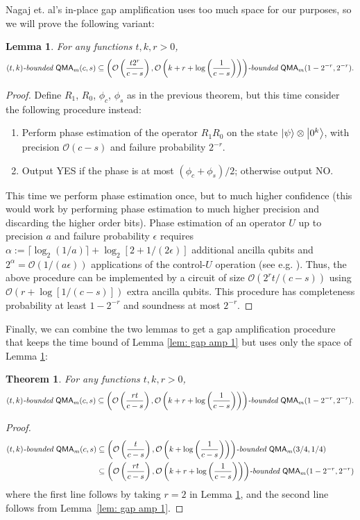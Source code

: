 \documentclass[11pt]{article}
\newtheorem{theorem}{Theorem}
\newtheorem{lemma}{Lemma}
\theoremstyle{definition}
\theoremstyle{remark}
\theoremstyle{definition}
\newcommand\QMA{{\sf{QMA}}}
\newcommand\bddQMA[5]{{\left(#1,#2\right)}\textit{-bounded }\QMA_{#3}(#4,#5)}
\newcommand\bigoh{\mathcal{O}}
\begin{document}
Nagaj et. al's in-place gap amplification uses too much space for our purposes, so we will prove the following variant:
\begin{lemma} \label{lem: gap amp 2}
For any functions $t,k,r>0$, 
\[
\bddQMA{t}{k}{m}{c}{s}\subseteq\bddQMA{\mathcal{O}\left(\frac{t2^r}{c-s}\right)}{\mathcal{O}\left(k+r+\log\left(\frac{1}{c-s}\right)\right)}{m}{1-2^{-r}}{2^{-r}}.
\]
\end{lemma}
\begin{proof}
Define $R_1$, $R_0$, $\phi_c$, $\phi_s$ as in the previous theorem, but this time consider the following procedure instead:
\begin{enumerate}
\item Perform phase estimation of the operator $R_1R_0$ on the state ${\left\vert{\psi}\right\rangle}\otimes {\left\vert{0^k}\right\rangle}$, with precision $\bigoh (c-s)$ and failure probability $2^{-r}$.
\item Output YES if the phase is at most $(\phi_{c}+\phi_{s})/2$; otherwise output NO.
\end{enumerate}
This time we perform phase estimation once, but to much higher confidence (this would work by performing phase estimation to much higher precision and discarding the higher order bits). 
Phase estimation of an operator $U$ up to precision $a$ and failure probability $\epsilon$ requires $\alpha := \lceil\log_2(1/a)\rceil + \log_2[2+1/(2\epsilon)]$ additional ancilla qubits and $2^\alpha = \mathcal{O}(1/(a\epsilon))$ applications of the control-$U$ operation (see e.g. \cite{nc00}).  Thus, the above procedure can be implemented by a circuit of size $\mathcal{O}(2^{r}t/(c-s))$ using $\mathcal{O}(r+\log[1/(c-s)])$ extra ancilla qubits. This procedure has completeness probability at least $1-2^{-r}$ and soundness at most $2^{-r}$.
\end{proof}

Finally, we can combine the two lemmas to get a gap amplification procedure that keeps the time bound of Lemma \ref{lem: gap amp 1} but uses only the space of Lemma \ref{lem: gap amp 2}:

\begin{theorem} \label{thm: gap amp}
For any functions $t,k,r>0$, 
\[
\bddQMA{t}{k}{m}{c}{s}\subseteq\bddQMA{\mathcal{O}\left(\frac{rt}{c-s}\right)}{\mathcal{O}\left(k+r+\log\left(\frac{1}{c-s}\right)\right)}{m}{1-2^{-r}}{2^{-r}}.
\]
\end{theorem}
\begin{proof}
\begin{align}
\bddQMA{t}{k}{m}{c}{s} &\subseteq \bddQMA{\mathcal{O}\left(\frac{t}{c-s}\right)}{\mathcal{O}\left(k+\log\left(\frac{1}{c-s}\right)\right)}{m}{3/4}{1/4}  \nonumber \\
&\subseteq \bddQMA{\mathcal{O}\left(\frac{rt}{c-s}\right)}{\mathcal{O}\left(k+r+\log\left(\frac{1}{c-s}\right)\right)}{m}{1-2^{-r}}{2^{-r}} \nonumber
\end{align}
where the first line follows by taking $r=2$ in Lemma \ref{lem: gap amp 2}, and the second line follows from Lemma~\ref{lem: gap amp 1}.
\end{proof}
\end{document}
